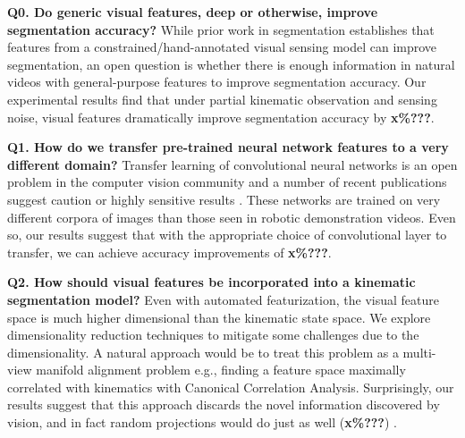 \textbf{Q0. Do generic visual features, deep or otherwise, improve segmentation accuracy? } While prior work in
segmentation establishes that features from a constrained/hand-annotated visual sensing model can improve
segmentation, an open question is whether there is enough information in natural videos with general-purpose features to improve segmentation accuracy. Our experimental results find that under partial kinematic observation and sensing noise, visual features dramatically improve segmentation accuracy by \textbf{x\%???}.

\vspace{0.25em}

\textbf{Q1. How do we transfer pre-trained neural network features to a very different domain? } Transfer learning of
convolutional neural networks is an open problem in the computer vision community and a number of recent publications
suggest caution or highly sensitive results \cite{oquab2014learning}.  These networks are trained on very different corpora of images than those seen in robotic demonstration videos. Even so, our results suggest that with the appropriate choice of convolutional layer to transfer, we can achieve accuracy improvements of \textbf{x\%???}.

\vspace{0.25em}

\textbf{Q2. How should visual features be incorporated into a kinematic segmentation model? } Even with automated
featurization, the visual feature space is  much higher dimensional than the kinematic state space. We
explore dimensionality reduction techniques to mitigate some challenges due to the dimensionality. A natural approach
would be to treat this problem as a multi-view manifold alignment problem e.g., finding a feature space maximally
correlated with kinematics with Canonical Correlation Analysis. Surprisingly, our results suggest that this approach
discards the novel information discovered by vision, and in fact random projections would do just as well
(\textbf{x\%???}) .

\vspace{0.25em}

